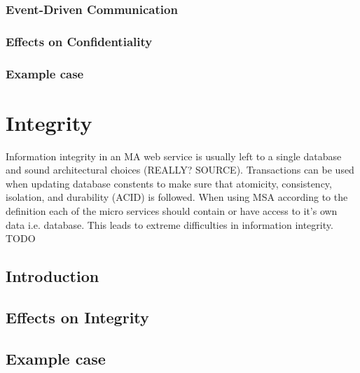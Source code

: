 \subsubsection{Event-Driven Communication}
\begin{sloppypar}
    
\end{sloppypar}




\subsubsection{Effects on Confidentiality}
\begin{sloppypar}
    
\end{sloppypar}




\subsubsection{Example case}
\begin{sloppypar}
    
\end{sloppypar}




\section{Integrity}
\begin{sloppypar}
    Information integrity in an MA web service is usually left to a single database 
    and sound architectural choices (REALLY? SOURCE).
    Transactions can be used when updating database constents to make sure that
    atomicity, consistency, isolation, and durability (ACID) \citep{acid} is followed.
    When using MSA according to the definition each of the micro services should contain 
    or have access to it's own data i.e. database. This leads to extreme difficulties in information integrity.
    TODO
\end{sloppypar}




\subsection{Introduction}
\subsection{Effects on Integrity}
\subsection{Example case}





